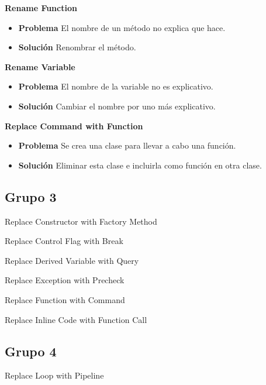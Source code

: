 \documentclass[11pt,a4paper,oneside]{book}
\begin{document}
\textbf{Rename Function}
\label{RenameFunction}
\begin{itemize}
    \item \textbf{Problema} El nombre de un método no explica que hace.
    
    \item \textbf{Solución} Renombrar el método.
    
\end{itemize}

\textbf{Rename Variable}
\label{RenameVariable}
\begin{itemize}
    \item \textbf{Problema} El nombre de la variable no es explicativo.
    
    \item \textbf{Solución} Cambiar el nombre por uno más explicativo.
    
\end{itemize}

\textbf{Replace Command with Function}
\label{ReplaceCommandWithFunction}
\begin{itemize}
    \item \textbf{Problema} Se crea una clase para llevar a cabo una función.
    
    \item \textbf{Solución} Eliminar esta clase e incluirla como función en otra clase.
    
\end{itemize}


\subsection{Grupo 3}
Replace Constructor with Factory Method

Replace Control Flag with Break

Replace Derived Variable with Query

Replace Exception with Precheck

Replace Function with Command

Replace Inline Code with Function Call

\subsection{Grupo 4}
Replace Loop with Pipeline
\end{document}

